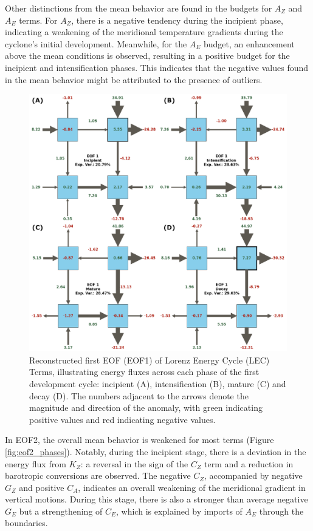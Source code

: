 Other distinctions from the mean behavior are found in the budgets for $A_Z$ and $A_E$ terms. For $A_Z$, there is a negative tendency during the incipient phase, indicating a weakening of the meridional temperature gradients during the cyclone's initial development. Meanwhile, for the $A_E$ budget, an enhancement above the mean conditions is observed, resulting in a positive budget for the incipient and intensification phases. This indicates that the negative values found in the mean behavior might be attributed to the presence of outliers.

\begin{figure}[!htbp]
\centering
\includegraphics[width=\textwidth]{figs_5/eof1_phases_reconstructed.pdf}
\caption[Reconstructed EOF1 - Phases]{Reconstructed first EOF (EOF1) of Lorenz Energy Cycle (LEC) Terms, illustrating energy fluxes across each phase of the first development cycle: incipient (A), intensification (B), mature (C) and decay (D).  The numbers adjacent to the arrows denote the magnitude and direction of the anomaly, with green indicating positive values and red indicating negative values.}
\label{fig:eof1_phases}
\end{figure}

In EOF2, the overall mean behavior is weakened for most terms (Figure \ref{fig:eof2_phases}). Notably, during the incipient stage, there is a deviation in the energy flux from $K_Z$: a reversal in the sign of the $C_Z$ term and a reduction in barotropic conversions are observed. The negative $C_Z$, accompanied by negative $G_Z$ and positive $C_A$, indicates an overall weakening of the meridional gradient in vertical motions. During this stage, there is also a stronger than average negative $G_E$ but a strengthening of $C_E$, which is explained by imports of $A_E$ through the boundaries.

